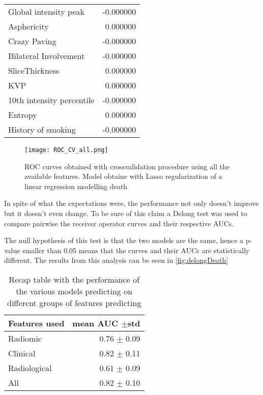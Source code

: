 \begin{table}
\begin{tabular}{lr}
			Global intensity peak               &                     -0.000000 \\
			Asphericity                         &                      0.000000 \\
			Crazy Paving                        &                     -0.000000 \\
			Bilateral Involvement               &                     -0.000000 \\
			SliceThickness                      &                      0.000000 \\
			KVP                                 &                      0.000000 \\
			10th intensity percentile           &                     -0.000000 \\
			Entropy                             &                      0.000000 \\
			History of smoking                  &                     -0.000000 \\
			\bottomrule
\end{tabular}
\end{table}

\begin{figure}[htbp]
	\centering
  		\texttt{[image: ROC\_CV\_all.png]}
        \caption{ROC curves obtained with crossvalidation procedure using all the available features. Model obtaine with Lasso regularization of a linear regression modelling death\label{fig:RocDeathAll}}
\end{figure}

In spite of what the expectations were, the performance not only doesn't improve but it doesn't even change. To be sure of this claim a Delong test was used to compare pairwise the receiver operator curves and their respective AUCs. 

The null hypothesis of this test is that the two models are the same, hence a p-value smaller than 0.05 means that the curves and their AUCs are statistically different. The results from this analysis can be seen in \ref{fig:delongDeath}

\begin{table}
\caption{Recap table with the performance of the various models predicting on different groups of features predicting \death \label{tab:RecapDeath}}
\centering
\begin{tabular}{l|r}
\toprule
Features used & mean AUC $\pm$std\\
\midrule
Radiomic  & 0.76 $\pm$ 0.09\\
Clinical  &  0.82 $\pm$ 0.11\\
Radiological & 0.61 $\pm$ 0.09\\
All & 0.82 $\pm$ 0.10 \\
\bottomrule
\end{tabular}
\end{table}



